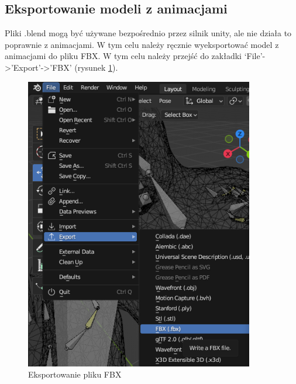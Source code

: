 \documentclass[12pt,twoside]{article}
\begin{document}
\subsection{Eksportowanie modeli z animacjami}
Pliki .blend mogą być używane bezpośrednio przez silnik unity, ale nie działa to
poprawnie z animacjami. W tym celu należy ręcznie wyeksportować model z
animacjami do pliku FBX. W tym celu należy przejść do zakładki
`File'->'Export'->'FBX' (rysunek \ref{ExportFBX}).
\begin{figure}[!ht]
    \centering
	\includegraphics[width=10cm]{RealizacjaProjektu/Export/ExportFBX.jpg}
	\caption{Eksportowanie pliku FBX}
    \label{ExportFBX}
\end{figure}
\end{document}
